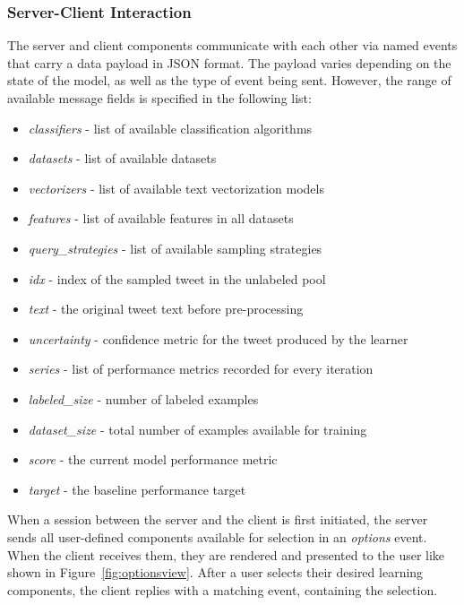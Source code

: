 \documentclass[a4paper,12pt]{article}
\begin{document}
\subsubsection{Server-Client Interaction}
\label{section:server-client}
The server and client components communicate with each other via named events that carry a data payload in JSON format. The payload varies depending on the state of the model, as well as the type of event being sent. However, the range of available message fields is specified in the following list:
\begin{itemize}[noitemsep]
    \item \emph{classifiers} - list of available classification algorithms
    \item \emph{datasets} - list of available datasets
    \item \emph{vectorizers} - list of available text vectorization models
    \item \emph{features} - list of available features in all datasets
    \item \emph{query\_strategies} - list of available sampling strategies
    \item \emph{idx} - index of the sampled tweet in the unlabeled pool
    \item \emph{text} - the original tweet text before pre-processing
    \item \emph{uncertainty} - confidence metric for the tweet produced by the learner
    \item \emph{series} - list of performance metrics recorded for every iteration
    \item \emph{labeled\_size} - number of labeled examples
    \item \emph{dataset\_size} - total number of examples available for training
    \item \emph{score} - the current model performance metric
    \item \emph{target} - the baseline performance target 
\end{itemize}
When a session between the server and the client is first initiated, the server sends all user-defined components available for selection in an \emph{options} event. When the client receives them, they are rendered and presented to the user like shown in Figure~\ref{fig:optionsview}. After a user selects their desired learning components, the client replies with a matching event, containing the selection.
\end{document}
